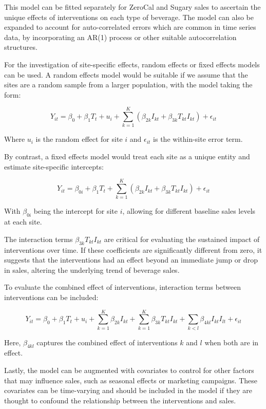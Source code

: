 \documentclass[
]{article}
\begin{document}
This model can be fitted separately for ZeroCal and Sugary sales to ascertain the unique effects of interventions on each type of beverage. The model can also be expanded to account for auto-correlated errors which are common in time series data, by incorporating an AR(1) process or other suitable autocorrelation structures.

For the investigation of site-specific effects, random effects or fixed effects models can be used. A random effects model would be suitable if we assume that the sites are a random sample from a larger population, with the model taking the form:

\[Y_{it} = \beta_0 + \beta_1 T_t + u_i + \sum_{k=1}^{K} (\beta_{2k} I_{kt} + \beta_{3k} T_{kt} I_{kt}) + \epsilon_{it} \]

Where \(u_i\) is the random effect for site \(i\) and \(\epsilon_{it}\) is the within-site error term.

By contrast, a fixed effects model would treat each site as a unique entity and estimate site-specific intercepts:

\[Y_{it} = \beta_{0i} + \beta_1 T_t + \sum_{k=1}^{K} (\beta_{2k} I_{kt} + \beta_{3k} T_{kt} I_{kt}) + \epsilon_{it} \]

With \(\beta_{0i}\) being the intercept for site \(i\), allowing for different baseline sales levels at each site.

The interaction terms \(\beta_{3k} T_{kt} I_{kt}\) are critical for evaluating the sustained impact of interventions over time. If these coefficients are significantly different from zero, it suggests that the interventions had an effect beyond an immediate jump or drop in sales, altering the underlying trend of beverage sales.

To evaluate the combined effect of interventions, interaction terms between interventions can be included:

\[Y_{it} = \beta_0 + \beta_1 T_t + u_i + \sum_{k=1}^{K} \beta_{2k} I_{kt} + \sum_{k=1}^{K} \beta_{3k} T_{kt} I_{kt} + \sum_{k<l} \beta_{4kl} I_{kt} I_{lt} + \epsilon_{it} \]

Here, \(\beta_{4kl}\) captures the combined effect of interventions \(k\) and \(l\) when both are in effect.

Lastly, the model can be augmented with covariates to control for other factors that may influence sales, such as seasonal effects or marketing campaigns. These covariates can be time-varying and should be included in the model if they are thought to confound the relationship between the interventions and sales.
\end{document}
